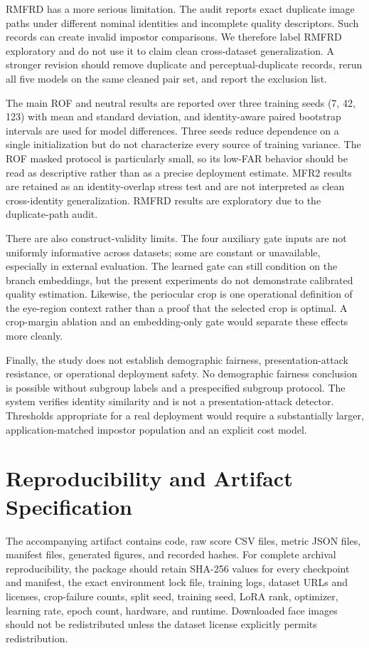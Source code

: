 ﻿\documentclass[10pt,journal,compsoc]{IEEEtran}
\begin{document}
RMFRD has a more serious limitation. The audit reports exact duplicate image paths under different nominal identities and incomplete quality descriptors. Such records can create invalid impostor comparisons. We therefore label RMFRD exploratory and do not use it to claim clean cross-dataset generalization. A stronger revision should remove duplicate and perceptual-duplicate records, rerun all five models on the same cleaned pair set, and report the exclusion list.

The main ROF and neutral results are reported over three training seeds (7, 42, 123) with mean and standard deviation, and identity-aware paired bootstrap intervals are used for model differences. Three seeds reduce dependence on a single initialization but do not characterize every source of training variance. The ROF masked protocol is particularly small, so its low-FAR behavior should be read as descriptive rather than as a precise deployment estimate. MFR2 results are retained as an identity-overlap stress test and are not interpreted as clean cross-identity generalization. RMFRD results are exploratory due to the duplicate-path audit.

There are also construct-validity limits. The four auxiliary gate inputs are not uniformly informative across datasets; some are constant or unavailable, especially in external evaluation. The learned gate can still condition on the branch embeddings, but the present experiments do not demonstrate calibrated quality estimation. Likewise, the periocular crop is one operational definition of the eye-region context rather than a proof that the selected crop is optimal. A crop-margin ablation and an embedding-only gate would separate these effects more cleanly.

Finally, the study does not establish demographic fairness, presentation-attack resistance, or operational deployment safety. No demographic fairness conclusion is possible without subgroup labels and a prespecified subgroup protocol. The system verifies identity similarity and is not a presentation-attack detector. Thresholds appropriate for a real deployment would require a substantially larger, application-matched impostor population and an explicit cost model.
\section{Reproducibility and Artifact Specification}
The accompanying artifact contains code, raw score CSV files, metric JSON files, manifest files, generated figures, and recorded hashes. For complete archival reproducibility, the package should retain SHA-256 values for every checkpoint and manifest, the exact environment lock file, training logs, dataset URLs and licenses, crop-failure counts, split seed, training seed, LoRA rank, optimizer, learning rate, epoch count, hardware, and runtime. Downloaded face images should not be redistributed unless the dataset license explicitly permits redistribution.
\end{document}
